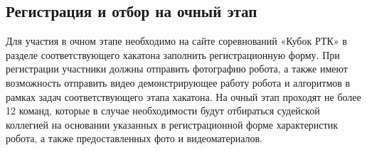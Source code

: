 \documentclass[12pt]{article}
\begin{document}
\subsection{Регистрация и отбор на очный этап} \hspace*{1cm}
Для участия в очном этапе необходимо на сайте соревнований «Кубок РТК» в разделе соответствующего хакатона заполнить регистрационную форму.
При регистрации участники должны отправить фотографию робота, а также имеют возможность отправить видео демонстрирующее работу робота и алгоритмов в рамках задач соответствующего этапа хакатона.
На очный этап проходят не более 12 команд, которые в случае необходимости будут отбираться судейской коллегией на основании указанных в регистрационной форме характеристик робота, а также предоставленных фото и видеоматериалов.

\end{document}
